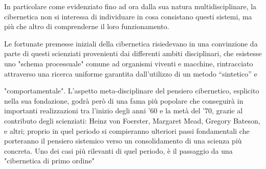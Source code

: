 In particolare come evidenziato fino ad ora dalla sua natura multidisciplinare,
la cibernetica non si interessa di individuare in
cosa consistano questi sistemi,
ma più che altro di comprenderne il loro funzionamento. 

Le fortunate premesse iniziali della cibernetica risiedevano in una convinzione
da parte di questi scienziati provenienti dai differenti ambiti disciplinari,
che esistesse uno "schema processuale" comune ad organismi viventi e macchine,
rintracciato attraverso una ricerca uniforme
garantita dall'utilizzo di un metodo
“sintetico” e


"comportamentale". 
L'aspetto meta-disciplinare del pensiero cibernetico,
esplicito nella sua fondazione, godrà però di una fama più popolare 
che conseguirà in importanti realizzazioni 
tra l'inizio degli anni '60 e la metà del '70, 
grazie al contributo degli scienziati:
Heinz von Foerster, Margaret Mead, Gregory Bateson, e altri;
proprio in quel periodo si compieranno ulteriori passi fondamentali che porteranno
il pensiero sistemico verso un consolidamento di una scienza più concreta.
Uno dei casi più rilevanti di quel periodo, è il passaggio da una "cibernetica di primo ordine"


